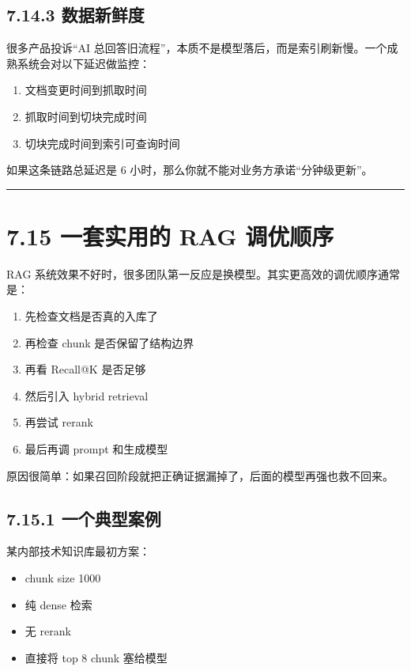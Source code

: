 \subsection{7.14.3 数据新鲜度}

很多产品投诉``AI 总回答旧流程''，本质不是模型落后，而是索引刷新慢。一个成熟系统会对以下延迟做监控：


\begin{enumerate}[leftmargin=2em]
\item 文档变更时间到抓取时间
\item 抓取时间到切块完成时间
\item 切块完成时间到索引可查询时间
\end{enumerate}

如果这条链路总延迟是 6 小时，那么你就不能对业务方承诺``分钟级更新''。


\bigskip\hrule\bigskip

\section{7.15 一套实用的 RAG 调优顺序}

RAG 系统效果不好时，很多团队第一反应是换模型。其实更高效的调优顺序通常是：


\begin{enumerate}[leftmargin=2em]
\item 先检查文档是否真的入库了
\item 再检查 chunk 是否保留了结构边界
\item 再看 Recall@K 是否足够
\item 然后引入 hybrid retrieval
\item 再尝试 rerank
\item 最后再调 prompt 和生成模型
\end{enumerate}

原因很简单：如果召回阶段就把正确证据漏掉了，后面的模型再强也救不回来。


\subsection{7.15.1 一个典型案例}

某内部技术知识库最初方案：


\begin{itemize}[leftmargin=2em]
\item chunk size 1000
\item 纯 dense 检索
\item 无 rerank
\item 直接将 top 8 chunk 塞给模型
\end{itemize}

